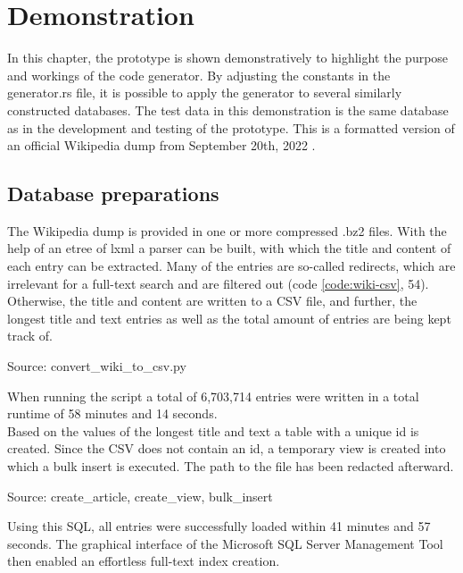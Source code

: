 \newpage
\section{Demonstration}
In this chapter, the prototype is shown demonstratively to highlight the purpose and workings of the code generator. By adjusting the constants in the generator.rs file, it is possible to apply the generator to several similarly constructed databases. The test data in this demonstration is the same database as in the development and testing of the prototype. This is a formatted version of an official Wikipedia dump from September 20th, 2022 \parencite[see][n.p.]{wikimedia_enwiki_2022}.
\subsection{Database preparations}
The Wikipedia dump is provided in one or more compressed .bz2 files. With the help of an etree of lxml a parser can be built, with which the title and content of each entry can be extracted. Many of the entries are so-called redirects, which are irrelevant for a full-text search and are filtered out (code \ref{code:wiki-csv}, 54). Otherwise, the title and content are written to a CSV file, and further, the longest title and text entries as well as the total amount of entries are being kept track of.
\begin{codeenv}
    \label{code:wiki-csv}
    
    \centerline{Source: convert\_wiki\_to\_csv.py}
\end{codeenv}
When running the script a total of 6,703,714 entries were written in a total runtime of 58 minutes and 14 seconds.\\
Based on the values of the longest title and text a table with a unique id is created. Since the CSV does not contain an id, a temporary view is created into which a bulk insert is executed. The path to the file has been redacted afterward.
\begin{codeenv}
    \label{code:wiki-sql}
    
    
    
    \centerline{Source: create\_article, create\_view, bulk\_insert}
\end{codeenv}
Using this \ac{SQL}, all entries were successfully loaded within 41 minutes and 57 seconds. The graphical interface of the Microsoft SQL Server Management Tool then enabled an effortless full-text index creation.
